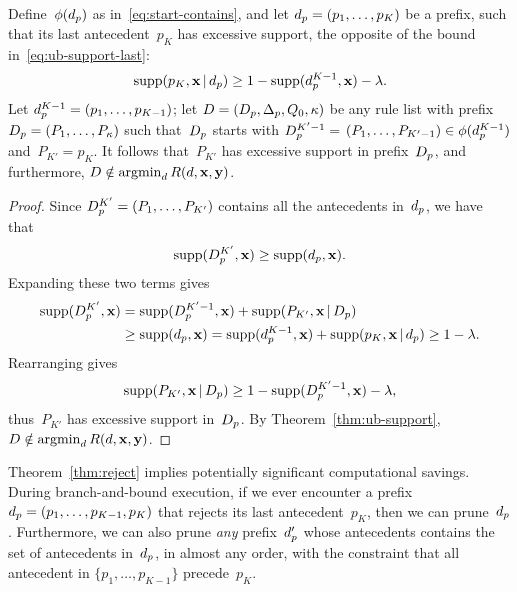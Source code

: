 \begin{arxiv}
\begin{proposition}
\label{prop:ub-support}
Define~$\phi(d_p)$ as in~\eqref{eq:start-contains},
and let ${d_p = (p_1, \dots, p_{K})}$ be a prefix,
such that its last antecedent~$p_{K}$ has excessive support,
\ie the opposite of the bound in~\eqref{eq:ub-support-last}:
\begin{align}
\textnormal{supp}(p_K, \mathbf{x} \,|\, d_p) \ge 1 - \textnormal{supp}(d_p^{K-1}, \mathbf{x}) - {\lambda}.
\end{align}
Let ${d_p^{K-1} = (p_1, \dots, p_{K-1})}$;
let ${{D} = (D_p, \Delta_p, Q_0, \kappa)}$
be any rule list with prefix
${D_p = (P_1, \dots, P_{\kappa})}$
such that~$D_p$ starts with ${D_p^{K'-1} =}$
${(P_1, \dots, P_{K'-1}) \in \phi(d_p^{K-1})}$
and~${P_{K'} = p_{K}}$.
%
It follows that~$P_{K'}$ has excessive support in prefix~$D_p$,
and furthermore, ${{D} \notin \operatorname*{argmin}_{{d}} R({d}, \mathbf{x}, \mathbf{y})}$.
\end{proposition}

\begin{proof}
Since ${D_p^{K'} = (P_1, \dots, P_{K'})}$
contains all the antecedents in~$d_p$, we have that
\begin{align}
\textnormal{supp}(D_p^{K'}, \mathbf{x}) \ge \textnormal{supp}(d_p, \mathbf{x}).
\end{align}
Expanding these two terms gives
\begin{align}
\textnormal{supp}(D_p^{K'}, \mathbf{x})
&= \textnormal{supp}(D_p^{K'-1}, \mathbf{x}) + \textnormal{supp}(P_{K'}, \mathbf{x} \,|\, D_p) \nonumber \\
&\ge \textnormal{supp}(d_p, \mathbf{x})
= \textnormal{supp}(d_p^{K-1}, \mathbf{x}) + \textnormal{supp}(p_K, \mathbf{x} \,|\, d_p)
\ge 1 - {\lambda}.
\end{align}
Rearranging gives
\begin{align}
\textnormal{supp}(P_{K'}, \mathbf{x} \,|\, D_p)
\ge 1 - \textnormal{supp}(D_p^{K'-1}, \mathbf{x}) - {\lambda},
\end{align}
thus~$P_{K'}$ has excessive support in~$D_p$.
%
By Theorem~\ref{thm:ub-support},
${{D} \notin \operatorname*{argmin}_{{d}} R({d}, \mathbf{x}, \mathbf{y})}$.
\end{proof}

Theorem~\ref{thm:reject} implies potentially significant
computational savings.
%
During branch-and-bound execution, if we ever encounter a
prefix ${d_p = (p_1, \dots, p_{K-1}, p_K)}$ that rejects its
last antecedent~$p_K$, then we can prune~$d_p$.
%
Furthermore, we can also prune \emph{any} prefix~$d_p'$
whose antecedents contains the set of antecedents in~$d_p$,
in almost any order, with the constraint that all antecedent
in ${\{p_1, \dots, p_{K-1}\}}$ precede~$p_K$.


\end{arxiv}
